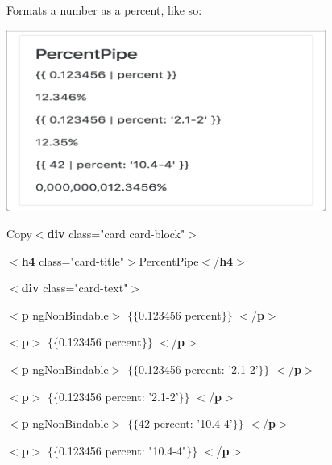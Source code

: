 \documentclass{article}
\begin{document}
\noindent 
\\ \\

\noindent Formats a number as a percent, like so:

\begin{center}
	\noindent \includegraphics*[width=4.12in, height=2.34in]{IMG-03-07}
\end{center}

\noindent Copy$\mathrm{<}$\textbf{div} class="card card-block"$\mathrm{>}$

$\mathrm{<}$\textbf{h4} class="card-title"$\mathrm{>}$PercentPipe$\mathrm{<}$/\textbf{h4}$\mathrm{>}$

$\mathrm{<}$\textbf{div} class="card-text"$\mathrm{>}$

$\mathrm{<}$\textbf{p} ngNonBindable$\mathrm{>}$ $\mathrm{\{}$$\mathrm{\{}$0.123456 {\textbar} percent$\mathrm{\}}$$\mathrm{\}}$ $\mathrm{<}$/\textbf{p}$\mathrm{>}$

$\mathrm{<}$\textbf{p}$\mathrm{>}$ $\mathrm{\{}$$\mathrm{\{}$0.123456 {\textbar} percent$\mathrm{\}}$$\mathrm{\}}$ $\mathrm{<}$/\textbf{p}$\mathrm{>}$

$\mathrm{<}$\textbf{p} ngNonBindable$\mathrm{>}$ $\mathrm{\{}$$\mathrm{\{}$0.123456 {\textbar} percent: '2.1-2'$\mathrm{\}}$$\mathrm{\}}$ $\mathrm{<}$/\textbf{p}$\mathrm{>}$

$\mathrm{<}$\textbf{p}$\mathrm{>}$ $\mathrm{\{}$$\mathrm{\{}$0.123456 {\textbar} percent: '2.1-2'$\mathrm{\}}$$\mathrm{\}}$ $\mathrm{<}$/\textbf{p}$\mathrm{>}$

$\mathrm{<}$\textbf{p} ngNonBindable$\mathrm{>}$ $\mathrm{\{}$$\mathrm{\{}$42 {\textbar} percent: '10.4-4'$\mathrm{\}}$$\mathrm{\}}$ $\mathrm{<}$/\textbf{p}$\mathrm{>}$

$\mathrm{<}$\textbf{p}$\mathrm{>}$ $\mathrm{\{}$$\mathrm{\{}$0.123456 {\textbar} percent: "10.4-4"$\mathrm{\}}$$\mathrm{\}}$ $\mathrm{<}$/\textbf{p}$\mathrm{>}$
\end{document}
